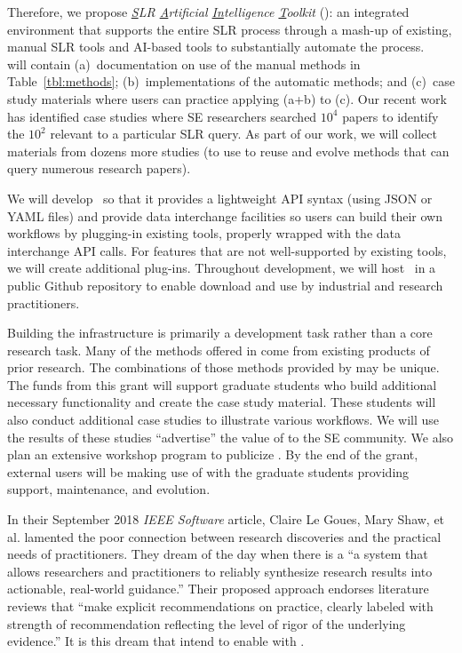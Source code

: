 Therefore, we propose  \textit{\underline{S}LR \underline{A}rtificial \underline{In}telligence \underline{T}oolkit} ({\IT}):
an integrated environment that supports the entire SLR process through a mash-up of existing, manual SLR tools and AI-based tools to substantially automate the process.
~{\IT} will contain (a)~documentation on use of the manual methods in Table~\ref{tbl:methods}; (b)~implementations of the automatic methods; and (c)~case study materials where users can practice applying (a+b) to (c). 
Our recent work has identified case studies where SE researchers searched $10^4$ papers to identify the $10^2$ relevant to a particular SLR query. 
As part of our work, we will collect materials from dozens more  studies (to use
to reuse and evolve   methods that can query  numerous research papers).

We will develop~{\IT} so that it provides a lightweight API syntax (using JSON or YAML files) and provide data interchange facilities so users can build their own workflows by plugging-in existing tools, properly wrapped with the data interchange API calls.
For features that are not well-supported by existing tools, we will create additional plug-ins.
Throughout development, we will host~{\IT} in a public Github repository to enable download and use by industrial and research practitioners.

Building the {\IT} infrastructure is primarily a development task rather than a core research task. 
Many of the methods offered in {\IT} come from existing products of prior research.
The combinations of those methods provided by {\IT} may be unique. 
The funds from this grant will support graduate students who build additional necessary functionality and create the case study material.
These students will also conduct additional case studies to illustrate various workflows.
We will use the results of these studies ``advertise'' the value of {\IT} to the SE community. 
We also plan an extensive workshop program to publicize {\IT}. 
By the end of the grant, external users will be making use of {\IT} with the graduate students providing support, maintenance, and evolution.

In their September 2018 \textit{IEEE Software} article, Claire Le Goues, Mary Shaw, et al. lamented the poor connection between research discoveries and the practical needs of practitioners. 
They dream of the day when there is a ``a system that allows researchers and practitioners to reliably synthesize research results into actionable, real-world guidance.'' 
Their proposed approach endorses  literature reviews that ``make  explicit recommendations on practice, clearly labeled with strength of recommendation reflecting the level of rigor of the underlying evidence.''
It is this dream that intend to enable with {\IT}.

